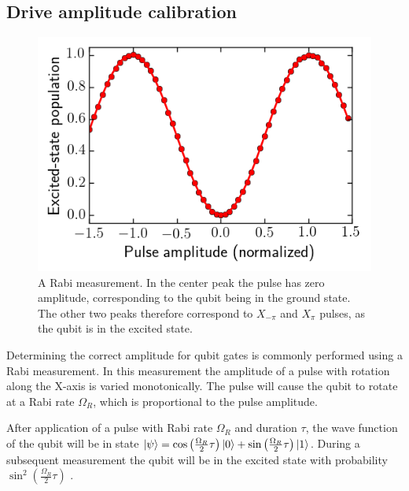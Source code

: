       \subsection{Drive amplitude calibration}
        \label{ssec:Rabi}

        \begin{figure}
          \begin{center}
          \vspace{-30pt}
            \includegraphics[width=\textwidth]{Figures/Qubit characterization/Rabi.png}
          \end{center}
          \vspace{-20 pt}
          \caption{A Rabi measurement. In the center peak the pulse has zero amplitude, corresponding to the qubit being in the ground state. The other two peaks therefore correspond to $X_{-\pi}$ and $X_\pi$ pulses, as the qubit is in the excited state.}
          \label{fig:Rabi}
        \end{figure}

        Determining the correct amplitude for qubit gates is commonly performed using a Rabi measurement. In this measurement the amplitude of a pulse with rotation along the X-axis is varied monotonically. The pulse will cause the qubit to rotate at a Rabi rate $\Omega_R$, which is proportional to the pulse amplitude.

        After application of a pulse with Rabi rate $\Omega_R$ and duration $\tau$, the wave function of the qubit will be in state $\ket{\psi} = \cos{\left( \frac{\Omega_R}{2} \tau \right) } \ket{0} + \sin{\left( \frac{\Omega_R}{2} \tau \right)} \ket{1}$. During a subsequent measurement the qubit will be in the excited state with probability $\sin^2{\left( \frac{\Omega_R}{2} \tau \right)}$ \cite{Reed}.

